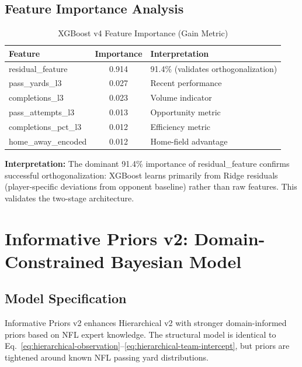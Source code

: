 \subsection{Feature Importance Analysis}

\begin{table}[htbp]
\centering
\caption{XGBoost v4 Feature Importance (Gain Metric)}
\label{tab:xgboost-feature-importance}
\small
\begin{tabular}{@{} l S[table-format=1.3] l @{}}
\toprule
\textbf{Feature} & \textbf{Importance} & \textbf{Interpretation} \\
\midrule
residual\_feature & 0.914 & 91.4\% (validates orthogonalization) \\
pass\_yards\_l3 & 0.027 & Recent performance \\
completions\_l3 & 0.023 & Volume indicator \\
pass\_attempts\_l3 & 0.013 & Opportunity metric \\
completions\_pct\_l3 & 0.012 & Efficiency metric \\
home\_away\_encoded & 0.012 & Home-field advantage \\
\bottomrule
\end{tabular}

\vspace{2mm}
\begin{minipage}{\linewidth}
\small
\textbf{Interpretation:} The dominant 91.4\% importance of residual\_feature confirms successful orthogonalization: XGBoost learns primarily from Ridge residuals (player-specific deviations from opponent baseline) rather than raw features. This validates the two-stage architecture.
\end{minipage}
\end{table}

\section{Informative Priors v2: Domain-Constrained Bayesian Model}
\label{sec:informative-priors-v2}

\subsection{Model Specification}

Informative Priors v2 enhances Hierarchical v2 with stronger domain-informed priors based on NFL expert knowledge. The structural model is identical to Eq.~\eqref{eq:hierarchical-observation}--\eqref{eq:hierarchical-team-intercept}, but priors are tightened around known NFL passing yard distributions.

